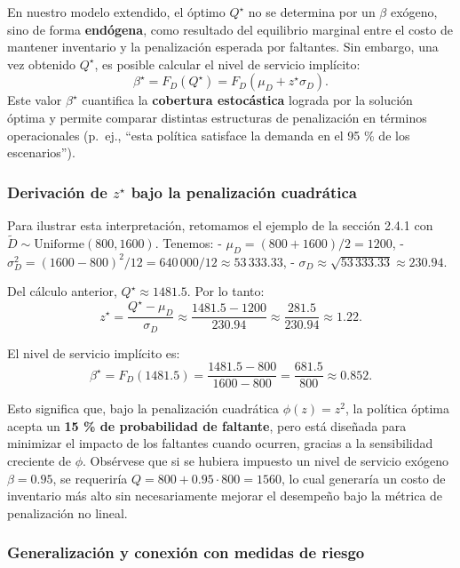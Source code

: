 \documentclass[
  spanish,
  us-letterpaper,
  DIV=11,
  numbers=noendperiod]{scrreprt}
\numberwithin{equation}{section}
\begin{document}
En nuestro modelo extendido, el óptimo \(Q^\star\) no se determina por
un \(\beta\) exógeno, sino de forma \textbf{endógena}, como resultado
del equilibrio marginal entre el costo de mantener inventario y la
penalización esperada por faltantes. Sin embargo, una vez obtenido
\(Q^\star\), es posible calcular el nivel de servicio implícito: \[
\beta^\star = F_D(Q^\star) = F_D(\mu_D + z^\star \sigma_D).
\] Este valor \(\beta^\star\) cuantifica la \textbf{cobertura
estocástica} lograda por la solución óptima y permite comparar distintas
estructuras de penalización en términos operacionales (p.~ej., ``esta
política satisface la demanda en el 95 \% de los escenarios'').

\subsubsection{\texorpdfstring{Derivación de \(z^\star\) bajo la
penalización
cuadrática}{Derivación de z\^{}\textbackslash star bajo la penalización cuadrática}}\label{derivaciuxf3n-de-zstar-bajo-la-penalizaciuxf3n-cuadruxe1tica}

Para ilustrar esta interpretación, retomamos el ejemplo de la sección
2.4.1 con \(\tilde{D} \sim \text{Uniforme}(800, 1600)\). Tenemos: -
\(\mu_D = (800 + 1600)/2 = 1200\), -
\(\sigma_D^2 = (1600 - 800)^2 / 12 = 640\,000 / 12 \approx 53\,333.33\),
- \(\sigma_D \approx \sqrt{53\,333.33} \approx 230.94\).

Del cálculo anterior, \(Q^\star \approx 1481.5\). Por lo tanto: \[
z^\star = \frac{Q^\star - \mu_D}{\sigma_D} \approx \frac{1481.5 - 1200}{230.94} \approx \frac{281.5}{230.94} \approx 1.22.
\]

El nivel de servicio implícito es: \[
\beta^\star = F_D(1481.5) = \frac{1481.5 - 800}{1600 - 800} = \frac{681.5}{800} \approx 0.852.
\]

Esto significa que, bajo la penalización cuadrática \(\phi(z) = z^2\),
la política óptima acepta un \textbf{15 \% de probabilidad de faltante},
pero está diseñada para minimizar el impacto de los faltantes cuando
ocurren, gracias a la sensibilidad creciente de \(\phi\). Obsérvese que
si se hubiera impuesto un nivel de servicio exógeno \(\beta = 0.95\), se
requeriría \(Q = 800 + 0.95 \cdot 800 = 1560\), lo cual generaría un
costo de inventario más alto sin necesariamente mejorar el desempeño
bajo la métrica de penalización no lineal.

\subsubsection{Generalización y conexión con medidas de
riesgo}\label{generalizaciuxf3n-y-conexiuxf3n-con-medidas-de-riesgo}
\end{document}
